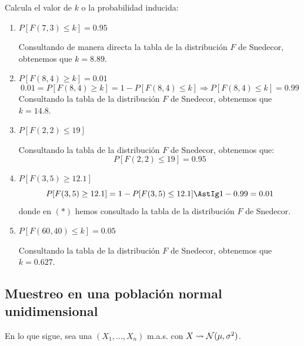 \begin{ejemplo}
    Calcula el valor de $k$ o la probabilidad inducida:
    \begin{enumerate}[label=\alph*)]
        \item $P[F(7,3) \leq k] = 0.95$
        
            Consultando de manera directa la tabla de la distribución $F$ de Snedecor, obtenemos que $k = 8.89$.
        \item $P[F(8,4) \geq k] = 0.01$
            \begin{equation*}
                0.01 = P[F(8,4) \geq k] = 1 - P[F(8,4) \leq k] \Longrightarrow P[F(8,4) \leq k] = 0.99
            \end{equation*}
            Consultando la tabla de la distribución $F$ de Snedecor, obtenemos que $k = 14.8$.
        \item $P[F(2,2) \leq 19]$
        
            Consultando la tabla de la distribución $F$ de Snedecor, obtenemos que:
            \begin{equation*}
                P[F(2,2) \leq 19] = 0.95
            \end{equation*}
        \item $P[F(3,5) \geq 12.1]$
            \begin{equation*}
                P[F(3,5) \geq 12.1] = 1-P[F(3,5) \leq 12.1] \AstIg 1-0.99 = 0.01
            \end{equation*}
            donde en $(\ast)$ hemos consultado la tabla de la distribución $F$ de Snedecor.
        \item $P[F(60,40) \leq k] = 0.05$
            
            Consultando la tabla de la distribución $F$ de Snedecor, obtenemos que $k = 0.627$.
    \end{enumerate}
\end{ejemplo}

\subsection{Muestreo en una población normal unidimensional}
En lo que sigue, sea una $(X_1, \ldots, X_n)$ m.a.s. con $X\rightsquigarrow \mathcal{N}(\mu, \sigma^2)$.

